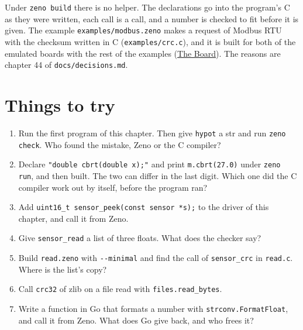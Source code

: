Under \verb|zeno build| there is no helper. The declarations go into
the program's C as they were written, each call is a call, and a
number is checked to fit before it is given. The example
\verb|examples/modbus.zeno| makes a request of Modbus RTU with the
checksum written in C (\verb|examples/crc.c|), and it is built for
both of the emulated boards with the rest of the examples
(\hyperref[ch-board]{The Board}). The reasons are chapter 44 of
\verb|docs/decisions.md|.

\section{Things to try}

\begin{enumerate}
\item Run the first program of this chapter. Then give \verb|hypot| a
  str and run \verb|zeno check|. Who found the mistake, Zeno or the C
  compiler?
\item Declare \verb|"double cbrt(double x);"| and print
  \verb|m.cbrt(27.0)| under \verb|zeno run|, and then built. The two
  can differ in the last digit. Which one did the C compiler work out
  by itself, before the program ran?
\item Add \verb|uint16_t sensor_peek(const sensor *s);| to the driver
  of this chapter, and call it from Zeno.
\item Give \verb|sensor_read| a list of three floats. What does the
  checker say?
\item Build \verb|read.zeno| with \verb|--minimal| and find the call of
  \verb|sensor_crc| in \verb|read.c|. Where is the list's copy?
\item Call \verb|crc32| of zlib on a file read with
  \verb|files.read_bytes|.
\item Write a function in Go that formats a number with
  \verb|strconv.FormatFloat|, and call it from Zeno. What does Go give
  back, and who frees it?
\end{enumerate}
